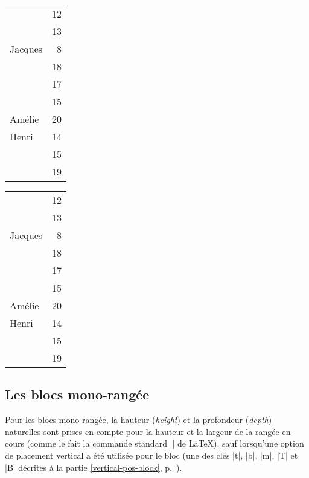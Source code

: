 \documentclass[dvipsnames]{article}%
\begin{document}
\medskip
\begin{scope}
\hfuzz=10cm
\begin{Code}[width=12cm]
\begin{NiceTabular}{@{}>{\color{blue}}lr@{}} \hline
{}    & 12 \\
                       & 13 \\ \hline
Jacques                &  8 \\ \hline
{} & 18 \\
                       & 17 \\
                       & 15 \\ \hline
Amélie                 & 20 \\ \hline
Henri                  & 14 \\ \hline
{}   & 15 \\
                       & 19 \\ \hline
\end{NiceTabular}
\end{Code}
\begin{NiceTabular}{@{}>{\color{blue}}lr@{}} \hline
{}    & 12 \\
                       & 13 \\ \hline
Jacques                &  8 \\ \hline
{} & 18 \\
                       & 17 \\
                       & 15 \\ \hline
Amélie                 & 20 \\ \hline
Henri                  & 14 \\ \hline
{}   & 15 \\
                       & 19 \\ \hline
\end{NiceTabular}
\end{scope}


\subsection{Les blocs mono-rangée}

Pour les blocs mono-rangée, la hauteur (\emph{height}) et la profondeur
(\emph{depth}) naturelles sont prises en compte pour la hauteur et la largeur de
la rangée en cours (comme le fait la commande standard |\multicolumn| de LaTeX),
sauf lorsqu'une option de placement vertical a été utilisée pour le bloc (une
des clés |t|, |b|, |m|, |T| et |B| décrites à la partie
\ref{vertical-pos-block}, p.~\pageref{vertical-pos-block}). 
\end{document}

